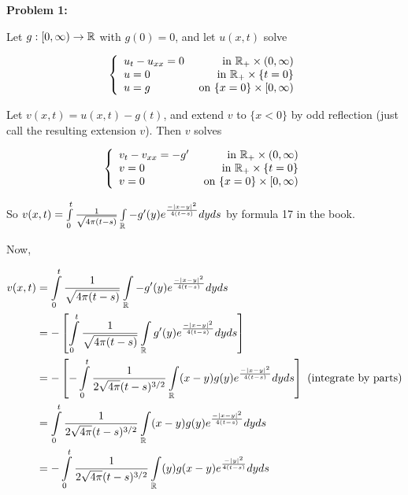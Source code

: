 \documentclass[a4paper,12pt]{article}
\begin{document}
{\bf Problem 1:} %

Let $g: [0,\infty) \to \mathbb{R}$ with $g(0) = 0$, and let $u(x,t)$ solve

\begin{displaymath}
   \left\{
     \begin{array}{lr}
       u_t - u_{xx} = 0 & \text{ in } \mathbb{R}_+ \times (0,\infty) \\
       u=0 & \text{ in } \mathbb{R}_+ \times \{t=0\}\\
       u=g & \text{ on } \{x=0\} \times [0,\infty)
     \end{array}
   \right.
\end{displaymath}

Let $v(x,t) = u(x,t) - g(t)$, and extend $v$ to $\{x<0\}$ by odd reflection (just call the resulting extension $v$). Then $v$ solves

\begin{displaymath}
   \left\{
     \begin{array}{lr}
       v_t - v_{xx} = -g' & \text{ in } \mathbb{R}_+ \times (0,\infty) \\
       v=0 & \text{ in } \mathbb{R}_+ \times \{t=0\}\\
       v=0 & \text{ on } \{x=0\} \times [0,\infty)
     \end{array}
   \right.
\end{displaymath}

So $v(x,t) = \int\limits_0^t \frac{1}{\sqrt{4 \pi (t-s)}} \int\limits_{\mathbb{R}} -g'(y) e^{\frac{-\left\lvert x-y \right\rvert^2}{4(t-s)}} dy ds$ by formula 17 in the book.

Now,

\begin{align*}
v(x,t) &= \int\limits_0^t \frac{1}{\sqrt{4 \pi (t-s)}} \int\limits_{\mathbb{R}} -g'(y) e^{\frac{-\left\lvert x-y \right\rvert^2}{4(t-s)}} dy ds\\
&= -\left[\int\limits_0^t \frac{1}{\sqrt{4 \pi (t-s)}} \int\limits_{\mathbb{R}} g'(y) e^{\frac{-\left\lvert x-y \right\rvert^2}{4(t-s)}} dy ds \right]\\
&= -\left[ -  \int\limits_0^t \frac{1}{2\sqrt{4 \pi }(t-s)^{3/2}} \int\limits_{\mathbb{R}} (x-y)g(y) e^{\frac{-\left\lvert x-y \right\rvert^2}{4(t-s)}} dy ds \right] \text{ (integrate by parts)}\\
&= \int\limits_0^t \frac{1}{2\sqrt{4 \pi }(t-s)^{3/2}} \int\limits_{\mathbb{R}} (x-y)g(y) e^{\frac{-\left\lvert x-y \right\rvert^2}{4(t-s)}} dy ds \\
&= -\int\limits_0^t \frac{1}{2\sqrt{4 \pi }(t-s)^{3/2}} \int\limits_{\mathbb{R}} (y)g(x-y) e^{\frac{-\left\lvert y \right\rvert^2}{4(t-s)}} dy ds \\
\end{align*}
\end{document}
